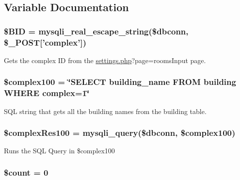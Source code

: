 \subsection{\-Variable \-Documentation}
\hypertarget{upRoomsTable_8php_a7458cf5c1cfaeb93fe055362ecff999e}{
\subsubsection[{\$\-B\-I\-D}]{\setlength{\rightskip}{0pt plus 5cm}\$\-B\-I\-D = mysqli\-\_\-real\-\_\-escape\-\_\-string(\$dbconn, \$\-\_\-\-P\-O\-S\-T\mbox{[}'complex'\mbox{]})}}\label{upRoomsTable_8php_a7458cf5c1cfaeb93fe055362ecff999e}
\-Gets the complex \-I\-D from the \hyperlink{settings_8php}{settings.\-php}?page=rooms\-Input page. \hypertarget{upRoomsTable_8php_a649817e46b95fbef9ea44e119999dada}{
\subsubsection[{\$complex100}]{\setlength{\rightskip}{0pt plus 5cm}\$complex100 = \char`\"{}\-S\-E\-L\-E\-C\-T building\-\_\-name \-F\-R\-O\-M building \-W\-H\-E\-R\-E complex=1\char`\"{}}}\label{upRoomsTable_8php_a649817e46b95fbef9ea44e119999dada}
\-S\-Q\-L string that gets all the building names from the building table. \hypertarget{upRoomsTable_8php_aa5d9e7c76b4a1d987e4877d6115c0a38}{
\subsubsection[{\$complex\-Res100}]{\setlength{\rightskip}{0pt plus 5cm}\$complex\-Res100 = mysqli\-\_\-query(\$dbconn, \$complex100)}}\label{upRoomsTable_8php_aa5d9e7c76b4a1d987e4877d6115c0a38}
\-Runs the \-S\-Q\-L \-Query in \$complex100 \hypertarget{upRoomsTable_8php_af789423037bbc89dc7c850e761177570}{
\subsubsection[{\$count}]{\setlength{\rightskip}{0pt plus 5cm}\$count = 0}}\label{upRoomsTable_8php_af789423037bbc89dc7c850e761177570}

